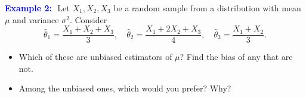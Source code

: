\documentclass[12pt]{beamer}
\newcommand{\fitO}{}
\newcommand{\exlists}{\setlength{\itemsep}{0pt}}
\newcommand{\thetahat}{\hat{\theta}}
\begin{document}
\begin{frame}[t]{}\fitO\exlists
\textcolor{blue}{\textbf{Example 2:}}\,\ Let $X_1,X_2,X_3$ be a random sample from a distribution
with mean $\mu$ and variance $\sigma^2$. Consider
{\small
\[
\thetahat_1=\frac{X_1+X_2+X_3}{3},\quad
\thetahat_2=\frac{X_1+2X_2+X_3}{4},\quad
\thetahat_3=\frac{X_1+X_2}{3}.
\]}
\begin{itemize}
\item[a)] Which of these are unbiased estimators of $\mu$? Find the bias of any that are not.\\[2.6cm]
\item[b)] Among the unbiased ones, which would you prefer? Why?\\[0.2cm]
\end{itemize}
\end{frame}
\end{document}
